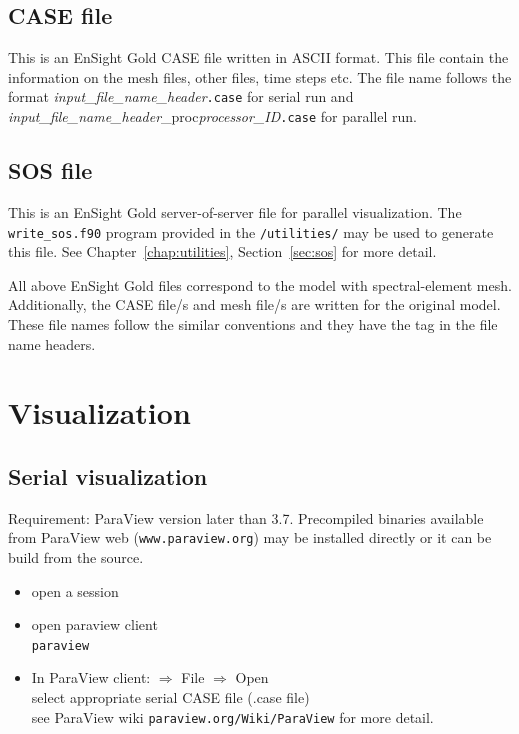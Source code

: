 \subsection{CASE file}

This is an EnSight Gold CASE file written in ASCII format. This file contain the information on the mesh files, other files, time steps etc. The file name follows the format \emph{input\_file\_name\_header}\texttt{.case} for serial run and \emph{input\_file\_name\_header}{\_proc}\emph{processor\_ID}\texttt{.case} for parallel run.

\subsection{SOS file}

This is an EnSight Gold server-of-server file for parallel visualization. The \texttt{write\_sos.f90} program provided in the \texttt{/utilities/} may be used to generate this file. See Chapter~\ref{chap:utilities}, Section~\ref{sec:sos} for more detail.

All above EnSight Gold files correspond to the model with spectral-element mesh. Additionally, the CASE file/s and mesh file/s are written for the original model. These file names follow the similar conventions and they have the tag \texttt{} in the file name headers.

\section{Visualization}
\subsection{Serial visualization}

Requirement: ParaView version later than 3.7. Precompiled binaries available from ParaView web (\texttt{www.paraview.org}) may be installed directly or it can be build from the source.

\begin{itemize}
\item open a session
\item open paraview client \\
\texttt{paraview}
\item In ParaView client: $\Rightarrow$ File $\Rightarrow$ Open\\
   select appropriate serial CASE file (.case file)\\
   see ParaView wiki \texttt{paraview.org/Wiki/ParaView} for more detail.
\end{itemize}

